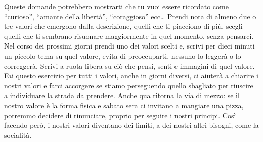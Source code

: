 \documentclass[12pt]{book} %
\begin{document}
Queste domande potrebbero mostrarti che tu vuoi essere ricordato come “curioso”, “amante della libertà”, “coraggioso” ecc… 
Prendi nota di almeno due o tre valori che emergono dalla descrizione, quelli che ti piacciono di più,
scegli quelli che ti sembrano risuonare maggiormente in quel momento, senza pensarci. Nel corso dei prossimi giorni
prendi uno dei valori scelti e, scrivi per dieci minuti un piccolo tema su quel valore, evita di preoccuparti, nessuno
lo leggerà o lo correggerà. Scrivi a ruota libera su ciò che pensi, senti e immagini di quel valore. Fai questo
esercizio per tutti i valori, anche in giorni diversi, ci aiuterà a chiarire i nostri valori e farci accorgere se
stiamo perseguendo quello sbagliato per riuscire a individuare la strada da prendere. Anche qua ritorna la via di
mezzo: se il nostro valore è la forma fisica e sabato sera ci invitano a mangiare una pizza, potremmo decidere di
rinunciare, proprio per seguire i nostri principi. Così facendo però, i nostri valori diventano dei limiti, a dei
nostri altri bisogni, come la socialità.
\end{document}
